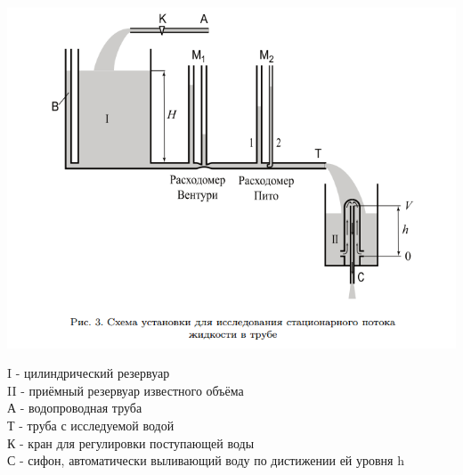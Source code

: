 \documentclass{article}
\begin{document}
\includegraphics[width=\textwidth]{facility.PNG}

I - цилиндрический резервуар\\
II - приёмный резервуар известного объёма\\
А - водопроводная труба\\
Т - труба с исследуемой водой\\
К - кран для регулировки поступающей воды\\
	\vspace{0.2cm}
С - сифон, автоматически выливающий воду по дистижении ей уровня h\\
\end{document}
